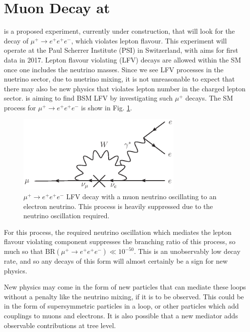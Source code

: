 \section{Muon Decay at \mueee}
\mueee \cite{Blondel:2013ia} is a proposed experiment, currently under construction, that will look for the decay of $\mu^+ \rightarrow e^+ e^+ e^-$, which violates lepton flavour.
This experiment will operate at the Paul Scherrer Institute (PSI) in Switzerland, with aims for first data in 2017.
Lepton flavour violating (LFV) decays are allowed within the SM once one includes the neutrino masses.
Since we see LFV processes in the nuetrino sector, due to nuetrino mixing, it is not unreasonable to expect that there may also be new physics that violates lepton number in the charged lepton sector.
\mueee is aiming to find BSM LFV by investigating such $\mu^+$ decays.
The SM process for $\mu^+ \rightarrow e^+ e^+ e^-$ is show in Fig. \ref{fig:mu_eee_SM}.
\begin{figure}[h]
    \centering
    \label{fig:mu_eee_SM}
    \includegraphics[height = 1.5in]{Figures/feynman_diagrams/mu_eee_SM.eps}
    \caption[$\mu^+ \rightarrow e^+ e^+ e^-$ lepton flavour violating decay through neutrino oscillation.]{$\mu^+ \rightarrow e^+ e^+ e^-$ LFV decay with a muon neutrino oscillating to an electron neutrino. This process is heavily suppressed due to the neutrino oscillation required.}
\end{figure}
For this process, the required neutrino oscillation which mediates the lepton flavour violating component suppresses the branching ratio of this process, so much so that $\textrm{BR}(\mu^+ \rightarrow e^+ e^+ e^-) \ll 10^{-50}$.
This is an unobservably low decay rate, and so any decays of this form will almost certainly be a sign for new physics.

New physics may come in the form of new particles that can mediate these loops without a penalty like the neutrino mixing, if it is to be observed.
This could be in the form of supersymmetric particles in a loop, or other particles which add couplings to muons and electrons.
It is also possible that a new mediator adds observable contributions at tree level.

